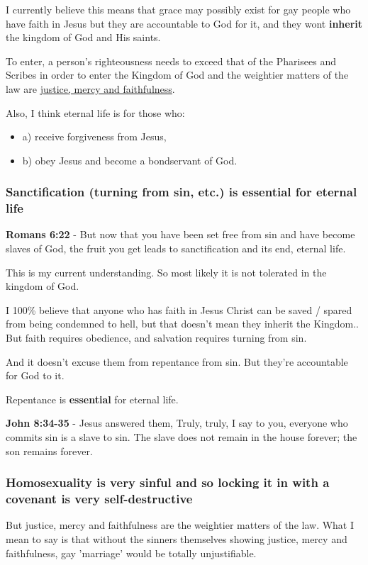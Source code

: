 \documentclass[11pt]{article}
\begin{document}
I currently believe this means that grace may possibly
exist for gay people who have faith in Jesus
but they are accountable to God for it, and
they wont \textbf{inherit} the kingdom of God and His saints.

To enter, a person's righteousness needs to exceed that of
the Pharisees and Scribes in order to enter the Kingdom of God and
the weightier matters of the law are \uline{justice, mercy and faithfulness}.

Also, I think eternal life is for those who:
\begin{itemize}
\item a) receive forgiveness from Jesus,
\item b) obey Jesus and become a bondservant of God.
\end{itemize}

\subsubsection{Sanctification (turning from sin, etc.) is essential for eternal life}
\label{sec:orgfcb0263}

\textbf{Romans 6:22} - But now that you have been set free from sin and have become slaves of God, the fruit you get leads to sanctification and its end, eternal life.

This is my current understanding. So most likely it is not tolerated in the kingdom of God.

I 100\% believe that anyone who has faith in Jesus Christ can be saved / spared from being condemned to hell, but that doesn't mean they inherit the Kingdom..
But faith requires obedience, and salvation requires turning from sin.

And it doesn't excuse them from repentance from sin.
But they're accountable for God to it.

Repentance is \textbf{essential} for eternal life.

\textbf{John 8:34-35} - Jesus answered them, Truly, truly, I say to you, everyone who commits sin is a slave to sin. The slave does not remain in the house forever; the son remains forever.

\subsubsection{Homosexuality is very sinful and so locking it in with a covenant is very self-destructive}
\label{sec:org5768f63}
But justice, mercy and faithfulness are the weightier matters of the law.
What I mean to say is that without the sinners themselves showing justice,
mercy and faithfulness, gay 'marriage' would be totally unjustifiable.
\end{document}
